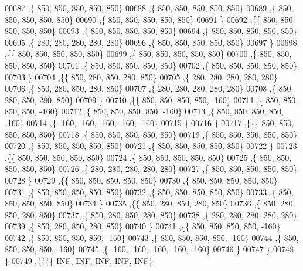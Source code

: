 \begin{DoxyCode}
00687    ,\{   850,   850,   850,   850,   850\}
00688    ,\{   850,   850,   850,   850,   850\}
00689    ,\{   850,   850,   850,   850,   850\}
00690    ,\{   850,   850,   850,   850,   850\}
00691    \}
00692   ,\{\{   850,   850,   850,   850,   850\}
00693    ,\{   850,   850,   850,   850,   850\}
00694    ,\{   850,   850,   850,   850,   850\}
00695    ,\{   280,   280,   280,   280,   280\}
00696    ,\{   850,   850,   850,   850,   850\}
00697    \}
00698   ,\{\{   850,   850,   850,   850,   850\}
00699    ,\{   850,   850,   850,   850,   850\}
00700    ,\{   850,   850,   850,   850,   850\}
00701    ,\{   850,   850,   850,   850,   850\}
00702    ,\{   850,   850,   850,   850,   850\}
00703    \}
00704   ,\{\{   850,   280,   850,   280,   850\}
00705    ,\{   280,   280,   280,   280,   280\}
00706    ,\{   850,   280,   850,   280,   850\}
00707    ,\{   280,   280,   280,   280,   280\}
00708    ,\{   850,   280,   850,   280,   850\}
00709    \}
00710   ,\{\{   850,   850,   850,   850,  -160\}
00711    ,\{   850,   850,   850,   850,  -160\}
00712    ,\{   850,   850,   850,   850,  -160\}
00713    ,\{   850,   850,   850,   850,  -160\}
00714    ,\{  -160,  -160,  -160,  -160,  -160\}
00715    \}
00716   \}
00717  ,\{\{\{   850,   850,   850,   850,   850\}
00718    ,\{   850,   850,   850,   850,   850\}
00719    ,\{   850,   850,   850,   850,   850\}
00720    ,\{   850,   850,   850,   850,   850\}
00721    ,\{   850,   850,   850,   850,   850\}
00722    \}
00723   ,\{\{   850,   850,   850,   850,   850\}
00724    ,\{   850,   850,   850,   850,   850\}
00725    ,\{   850,   850,   850,   850,   850\}
00726    ,\{   280,   280,   280,   280,   280\}
00727    ,\{   850,   850,   850,   850,   850\}
00728    \}
00729   ,\{\{   850,   850,   850,   850,   850\}
00730    ,\{   850,   850,   850,   850,   850\}
00731    ,\{   850,   850,   850,   850,   850\}
00732    ,\{   850,   850,   850,   850,   850\}
00733    ,\{   850,   850,   850,   850,   850\}
00734    \}
00735   ,\{\{   850,   280,   850,   280,   850\}
00736    ,\{   850,   280,   850,   280,   850\}
00737    ,\{   850,   280,   850,   280,   850\}
00738    ,\{   280,   280,   280,   280,   280\}
00739    ,\{   850,   280,   850,   280,   850\}
00740    \}
00741   ,\{\{   850,   850,   850,   850,  -160\}
00742    ,\{   850,   850,   850,   850,  -160\}
00743    ,\{   850,   850,   850,   850,  -160\}
00744    ,\{   850,   850,   850,   850,  -160\}
00745    ,\{  -160,  -160,  -160,  -160,  -160\}
00746    \}
00747   \}
00748  \}
00749 ,\{\{\{\{   \mbox{\hyperlink{1_88_84__epars_8h_a12c2040f25d8e3a7b9e1c2024c618cb6}{INF}},   \mbox{\hyperlink{1_88_84__epars_8h_a12c2040f25d8e3a7b9e1c2024c618cb6}{INF}},   \mbox{\hyperlink{1_88_84__epars_8h_a12c2040f25d8e3a7b9e1c2024c618cb6}{INF}},   \mbox{\hyperlink{1_88_84__epars_8h_a12c2040f25d8e3a7b9e1c2024c618cb6}{INF}},   \mbox{\hyperlink{1_88_84__epars_8h_a12c2040f25d8e3a7b9e1c2024c618cb6}{INF}}\}

\end{DoxyCode}
